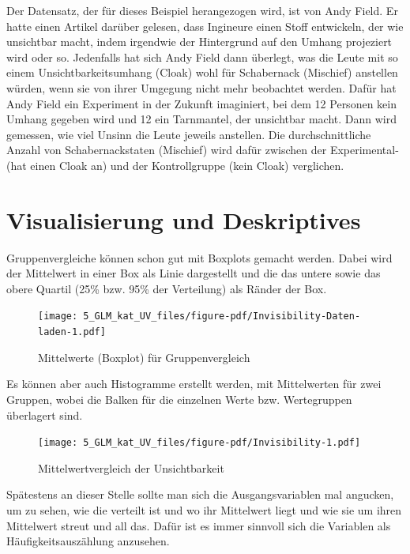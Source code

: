 \documentclass[
  10pt,
  letterpaper,
  a4paper, twoside]{scrreprt}
\begin{document}
Der Datensatz, der für dieses Beispiel herangezogen wird, ist von Andy
Field. Er hatte einen Artikel darüber gelesen, dass Ingineure einen
Stoff entwickeln, der wie unsichtbar macht, indem irgendwie der
Hintergrund auf den Umhang projeziert wird oder so. Jedenfalls hat sich
Andy Field dann überlegt, was die Leute mit so einem
Unsichtbarkeitsumhang (Cloak) wohl für Schabernack (Mischief) anstellen
würden, wenn sie von ihrer Umgegung nicht mehr beobachtet werden. Dafür
hat Andy Field ein Experiment in der Zukunft imaginiert, bei dem 12
Personen kein Umhang gegeben wird und 12 ein Tarnmantel, der unsichtbar
macht. Dann wird gemessen, wie viel Unsinn die Leute jeweils anstellen.
Die durchschnittliche Anzahl von Schabernackstaten (Mischief) wird dafür
zwischen der Experimental- (hat einen Cloak an) und der Kontrollgruppe
(kein Cloak) verglichen.

\section{Visualisierung und
Deskriptives}\label{visualisierung-und-deskriptives}

Gruppenvergleiche können schon gut mit Boxplots gemacht werden. Dabei
wird der Mittelwert in einer Box als Linie dargestellt und die das
untere sowie das obere Quartil (25\% bzw. 95\% der Verteilung) als
Ränder der Box.

\begin{figure}[H]

{\centering \texttt{[image: 5\_GLM\_kat\_UV\_files/figure-pdf/Invisibility-Daten-laden-1.pdf]}

}

\caption{Mittelwerte (Boxplot) für Gruppenvergleich}

\end{figure}%

Es können aber auch Histogramme erstellt werden, mit Mittelwerten für
zwei Gruppen, wobei die Balken für die einzelnen Werte bzw. Wertegruppen
überlagert sind.

\begin{figure}[H]

{\centering \texttt{[image: 5\_GLM\_kat\_UV\_files/figure-pdf/Invisibility-1.pdf]}

}

\caption{Mittelwertvergleich der Unsichtbarkeit}

\end{figure}%

Spätestens an dieser Stelle sollte man sich die Ausgangsvariablen mal
angucken, um zu sehen, wie die verteilt ist und wo ihr Mittelwert liegt
und wie sie um ihren Mittelwert streut und all das. Dafür ist es immer
sinnvoll sich die Variablen als Häufigkeitsauszählung anzusehen.
\end{document}
